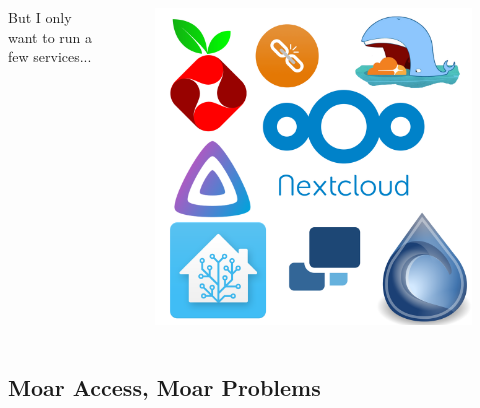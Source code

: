 \documentclass{beamer}
\begin{document}
\begin{frame}
    \begin{columns}
        \begin{column}{0.5\textwidth}
            But I only want to run a few services...
        \end{column}
        \begin{column}{0.5\textwidth}
            \begin{figure}
                \centering
                \includegraphics[width=1\textwidth,keepaspectratio]{../resources/logos.png}
            \end{figure}
        \end{column}
    \end{columns}
\end{frame}

\subsection{Moar Access, Moar Problems}
\end{document}
